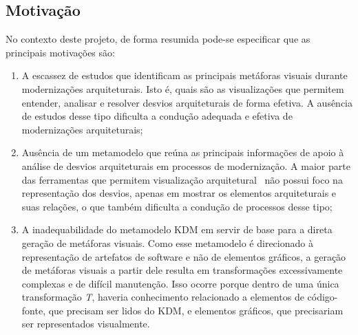 \documentclass[12pt]{article}
\begin{document}
\subsection{Motivação}


No contexto deste projeto, de forma resumida pode-se especificar que as principais motivações são:

\begin{enumerate}

\item A escassez de estudos que identificam as principais metáforas visuais durante modernizações arquiteturais. Isto é, quais são as visualizações que permitem entender, analisar e resolver desvios arquiteturais de forma efetiva. A ausência de estudos desse tipo dificulta a condução adequada e efetiva de modernizações arquiteturais;

\item Ausência de um metamodelo que reúna as principais informações de apoio à análise de desvios arquiteturais em processos de modernização. A maior parte das ferramentas que permitem visualização arquitetural~\cite{Maffort_2013, Knodel_2007, ArchJava_2202} não possui foco na representação dos desvios, apenas em mostrar os elementos arquiteturais e suas relações, o que também dificulta a condução de processos desse tipo;

\item A inadequabilidade do metamodelo KDM em servir de base para a direta geração de metáforas visuais. Como esse metamodelo é direcionado à representação de artefatos de software e não de elementos gráficos, a geração de metáforas visuais a partir dele resulta em transformações excessivamente complexas e de difícil manutenção. Isso ocorre porque dentro de uma única transformação \textit{T}, haveria conhecimento relacionado a elementos de código-fonte, que precisam ser lidos do KDM, e elementos gráficos, que precisariam ser representados visualmente.
\end{enumerate}
\end{document}
